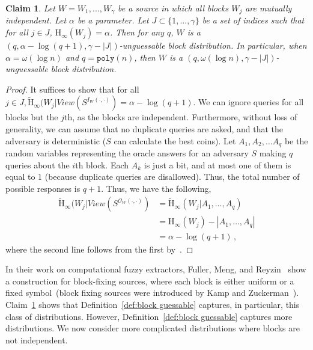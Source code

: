 \documentclass[11pt]{article}
\newcommand{\defref}[1]{\mbox{Definition~\ref{#1}}}
\newcommand{\clref}[1]{\mbox{Claim~\ref{#1}}}
\newcommand{\poly}{\ensuremath{\mathtt{poly}}\xspace}
\newcommand{\Hoo}{\mathrm{H}_\infty}
\newcommand{\Hav}{\tilde{\mathrm{H}}_\infty}
\newtheorem{claim}[theorem]{Claim}
\begin{document}
\begin{claim}
\label{cl:independent high ent}
Let $W = W_1,  ... , W_\gamma$ be a source in which all blocks $W_j$  are mutually independent.  Let $\alpha$ be a parameter.  Let $J\subset \{1,..., \gamma\}$ be a set of indices such that for all $j\in J$, $\Hoo(W_j ) =\alpha $.  Then for any $q$, $W$ is a $(q, \alpha - \log (q+1), \gamma - |J|)$-unguessable block distribution.  In particular, when $\alpha = \omega(\log n)$ and $q = \poly(n)$, then $W$ is a $(q, \omega(\log n), \gamma - |J|)$-unguessable block distribution.
\end{claim}
\begin{proof}
It suffices to show that for all $j\in J, \Hav(W_j |View(S^{I_{W}(\cdot, \cdot)}) = \alpha -\log (q+1)$.
We can ignore queries for all blocks but the $j$th, as the blocks are independent. Furthermore, without loss of generality, we can assume that no duplicate queries are asked, and that the adversary is deterministic ($S$ can calculate the best coins). Let $A_1, A_2, \dots A_q$ be the random variables representing the oracle answers for an  adversary $S$ making $q$  queries about the $i$th block. Each $A_k$ is just a bit, and at most one of them  is equal to 1 (because duplicate queries are disallowed). Thus, the total number of possible responses is $q+1$. Thus, we have the following,
\begin{align*}
\Hav(W_j | View(S^{\mathcal{O}_{W}(\cdot, \cdot)}) &= \Hav(W_j| A_1, \dots, A_q)\\
&=\Hoo(W_j) - |A_1, \dots, A_q|\\
&=\alpha - \log (q+1)\,,
\end{align*}
where the second line follows from the first by~\cite[Lemma 2.2]{DBLP:journals/siamcomp/DodisORS08}.
\end{proof}
\noindent In their work on computational fuzzy extractors, Fuller, Meng, and Reyzin~\cite{fuller2013computational} show a construction for block-fixing sources, where each block is either uniform or a fixed symbol~(block fixing sources were introduced by Kamp and Zuckerman~\cite{KZ07}).  \clref{cl:independent high ent} shows that \defref{def:block guessable} captures, in particular, this class of distributions.
However, \defref{def:block guessable} captures more distributions.  We now consider more complicated distributions where blocks are not independent.
\end{document}
